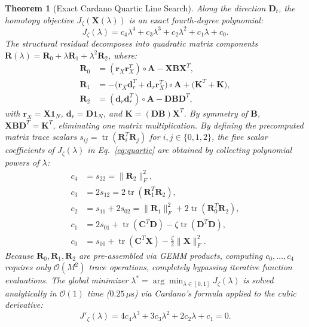 \documentclass[a4paper,fleqn]{cas-dc}
\theoremstyle{thmstyleone}
\newtheorem{theorem}{Theorem}
\theoremstyle{thmstyletwo}
\theoremstyle{thmstylethree}
\begin{document}
\begin{theorem}[Exact Cardano Quartic Line Search]
\label{thm:quartic_line_search}
Along the direction $\mathbf{D}_t$, the homotopy objective $J_\zeta(\mathbf{X}(\lambda))$ is an exact fourth-degree polynomial:
\begin{equation}
J_\zeta(\lambda) = c_4 \lambda^4 + c_3 \lambda^3 + c_2 \lambda^2 + c_1 \lambda + c_0.
\label{eq:quartic}
\end{equation}
The structural residual decomposes into quadratic matrix components $\mathbf{R}(\lambda) = \mathbf{R}_0 + \lambda \mathbf{R}_1 + \lambda^2 \mathbf{R}_2$, where:
\begin{align}
\mathbf{R}_0 &= (\mathbf{r}_X \mathbf{r}_X^T) \circ \mathbf{A} - \mathbf{X}\mathbf{B}\mathbf{X}^T, \nonumber \\
\mathbf{R}_1 &= -\big(\mathbf{r}_X \mathbf{d}_r^T + \mathbf{d}_r \mathbf{r}_X^T\big) \circ \mathbf{A} + \big(\mathbf{K}^T + \mathbf{K}\big), \nonumber \\
\mathbf{R}_2 &= (\mathbf{d}_r \mathbf{d}_r^T) \circ \mathbf{A} - \mathbf{D}\mathbf{B}\mathbf{D}^T,
\end{align}
with $\mathbf{r}_X = \mathbf{X}\mathbf{1}_N$, $\mathbf{d}_r = \mathbf{D}\mathbf{1}_N$, and $\mathbf{K} = (\mathbf{D}\mathbf{B})\mathbf{X}^T$. By symmetry of $\mathbf{B}$, $\mathbf{X}\mathbf{B}\mathbf{D}^T = \mathbf{K}^T$, eliminating one matrix multiplication. By defining the precomputed matrix trace scalars $s_{ij} = \operatorname{tr}(\mathbf{R}_i^T \mathbf{R}_j)$ for $i, j \in \{0, 1, 2\}$, the five scalar coefficients of $J_\zeta(\lambda)$ in Eq.~\eqref{eq:quartic} are obtained by collecting polynomial powers of $\lambda$:
\begin{align}
c_4 &= s_{22} = \|\mathbf{R}_2\|_F^2, \nonumber \\
c_3 &= 2 s_{12} = 2 \operatorname{tr}(\mathbf{R}_1^T \mathbf{R}_2), \nonumber \\
c_2 &= s_{11} + 2 s_{02} = \|\mathbf{R}_1\|_F^2 + 2 \operatorname{tr}(\mathbf{R}_0^T \mathbf{R}_2), \nonumber \\
c_1 &= 2 s_{01} + \operatorname{tr}(\mathbf{C}^T \mathbf{D}) - \zeta \operatorname{tr}(\mathbf{D}^T \mathbf{D}), \nonumber \\
c_0 &= s_{00} + \operatorname{tr}(\mathbf{C}^T \mathbf{X}) - \frac{\zeta}{2} \|\mathbf{X}\|_F^2.
\label{eq:quartic_coefficients}
\end{align}
Because $\mathbf{R}_0, \mathbf{R}_1, \mathbf{R}_2$ are pre-assembled via GEMM products, computing $c_0, \dots, c_4$ requires only $\mathcal{O}(M^2)$ trace operations, completely bypassing iterative function evaluations. The global minimizer $\lambda^* = \arg\min_{\lambda \in [0, 1]} J_\zeta(\lambda)$ is solved analytically in $\mathcal{O}(1)$ time ($0.25\,\mu\text{s}$) via Cardano's formula applied to the cubic derivative:
\begin{equation}
J'_\zeta(\lambda) = 4 c_4 \lambda^3 + 3 c_3 \lambda^2 + 2 c_2 \lambda + c_1 = 0.
\label{eq:cubic_root}
\end{equation}
\end{theorem}
\end{document}
